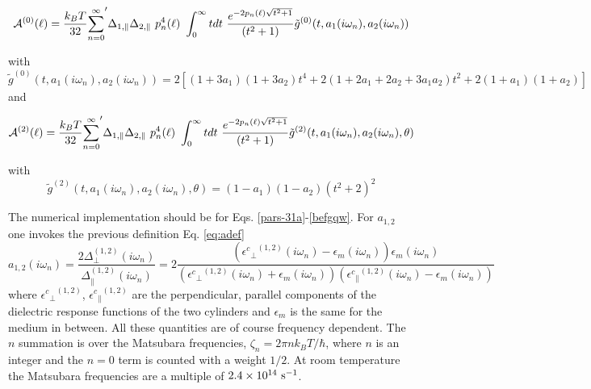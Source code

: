 \documentclass[onecolumn,letterpaper,amsmath,amssymb,floatfix,aps,superscriptaddress]{revtex4}
\begin{document}
\begin{widetext}
\begin{equation}
{\cal A}^{(0)}(\ell) = \frac{k_BT}{32}  {\sum_{n=0}^{\infty}}' \Delta_{1,\parallel} \Delta_{2,\parallel} ~p_n^{4}(\ell) ~\int_0^{\infty} t dt ~\frac{e^{- 2 p_n(\ell) \sqrt{t^{2} + 1}}}{(t^{2} + 1)} \tilde g^{(0)}(t, a_1(i \omega_n), a_2(i \omega_n))
\label{eq:a0}
\end{equation}
\end{widetext}
with
\begin{equation}
\tilde g^{(0)}(t, a_1(i \omega_n), a_2(i \omega_n)) = 2 \left[ (1+3a_1)(1+3a_2) t^{4} + 2 (1+2a_1+2a_2+3a_1a_2) t^{2}  + 2(1+a_1)(1+a_2)\right]
\end{equation}
and
\begin{widetext}
\begin{equation}
{\cal A}^{(2)}(\ell) = \frac{k_BT}{32}  {\sum_{n=0}^{\infty}}' \Delta_{1,\parallel} \Delta_{2,\parallel} ~p_n^{4}(\ell) ~\int_0^{\infty} t dt ~\frac{e^{- 2 p_n(\ell) \sqrt{t^{2} + 1}}}{(t^{2} + 1)} \tilde g^{(2)}(t, a_1(i \omega_n), a_2(i \omega_n), \theta)
\end{equation}
\end{widetext}
with
\begin{equation}<C-LeftRelease>
\tilde g^{(2)}(t, a_1(i \omega_n), a_2(i \omega_n), \theta) = (1-a_1)(1-a_2)(t^{2} + 2)^2
\label{befgqw}
\end{equation}

The numerical implementation should be for Eqs. \ref{pars-31a}-\ref{befgqw}. For $a_{1,2}$ one invokes the previous definition Eq. \ref{eq:adef}
\begin{equation}
a_{1,2}(i \omega_n) = \frac{2 \Delta_{\perp}^{(1,2)}(i \omega_n)}{\Delta_{\parallel}^{(1,2)}(i \omega_n)} = 2 \frac{({{\epsilon^{c}}_{\perp}}^{(1,2)}(i \omega_n) -\epsilon_{m}(i \omega_n)) \epsilon_{m}(i \omega_n)}{({{\epsilon^{c}}_{\perp}}^{(1,2)}(i \omega_n)+\epsilon_{m}(i \omega_n)) ({{\epsilon^{c}}_{\parallel}}^{(1,2)}(i \omega_n) -\epsilon_{m}(i \omega_n))}
\label{eq:adef}
\end{equation}
where ${{\epsilon^{c}}_{\perp}}^{(1,2)}$, ${{\epsilon^{c}}_{\parallel}}^{(1,2)}$ are the perpendicular, parallel components of the dielectric response functions of the two cylinders and $\epsilon_{m}$ is the same for the medium in between. All these quantities are of course frequency dependent. The $n$ summation is over the Matsubara frequencies, $\zeta_n = 2\pi n k_BT/\hbar$, where $n$ is an integer and the $n=0$ term is counted with a weight $1/2$. At room temperature the Matsubara frequencies are a multiple of $\rm 2.4 \times 10^{14}~s^{-1}$.
\end{document}
